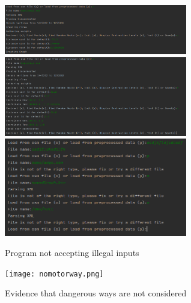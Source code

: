 \documentclass[11pt,twoside,a4paper]{report}
\begin{document}
\begin{figure}[h]
    \begin{center}
        \includegraphics[width=8cm]{distancecost.png}\\
        \includegraphics[width=8cm]{coordinateinput.png}\\
        \includegraphics[width=8cm]{loadfile.png}
    \end{center}
    \caption{Program not accepting illegal inputs}
    \label{No illegal inputs}
\end{figure}
\begin{figure}[h]
    \begin{center}
        \texttt{[image: nomotorway.png]}
    \end{center}
    \caption{Evidence that dangerous ways are not considered}
    \label{nomotorway}
\end{figure}
\end{document}

